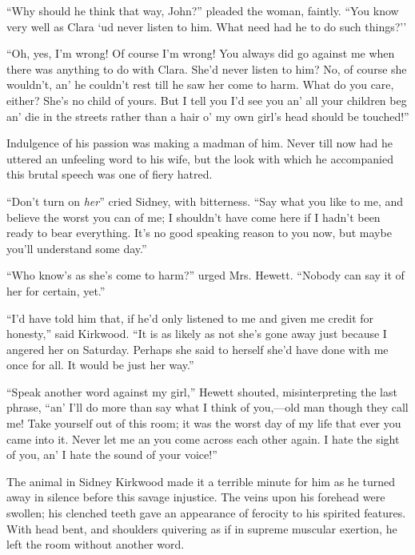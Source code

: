 ``Why should he think that way, John?'' pleaded the woman, faintly.
``You know very well as Clara `ud never listen to him. What need had he
to do such things?''

``Oh, yes, I'm wrong! Of course I'm wrong! You always did go against me
when there was anything to do with Clara. She'd never listen to him? No,
of course she wouldn't, an' he couldn't rest till he saw her come to
harm. What do you care, either? She's no child of yours. But I tell you
I'd see you an' all your children beg an' die in the streets rather than
a hair o' my own girl's head should be touched!''

Indulgence of his passion was making a madman of him. Never till now had
he uttered an unfeeling word to his wife, but the look with which he
accompanied this brutal speech was one of fiery hatred.

``Don't turn on \emph{her}'' cried Sidney, with bitterness. ``Say what
you like to me, and {}believe the worst you can of me; I shouldn't have
come here if I hadn't been ready to bear everything. It's no good
speaking reason to you now, but maybe you'll understand some day.''

``Who know's as she's come to harm?'' urged Mrs. Hewett. ``Nobody can
say it of her for certain, yet.''

``I'd have told him that, if he'd only listened to me and given me
credit for honesty,'' said Kirkwood. ``It is as likely as not she's gone
away just because I angered her on Saturday. Perhaps she said to herself
she'd have done with me once for all. It would be just her way.''

``Speak another word against my girl,'' Hewett shouted, misinterpreting
the last phrase, ``an' I'll do more than say what I think of you,---old
man though they call me! Take yourself out of this room; it was the
worst day of my life that ever you came into it. Never let me an you
come across each other again. I hate the sight of you, an' I hate the
sound of your voice!''

{}The animal in Sidney Kirkwood made it a terrible minute for him as he
turned away in silence before this savage injustice. The veins upon his
forehead were swollen; his clenched teeth gave an appearance of ferocity
to his spirited features. With head bent, and shoulders quivering as if
in supreme muscular exertion, he left the room without another word.

